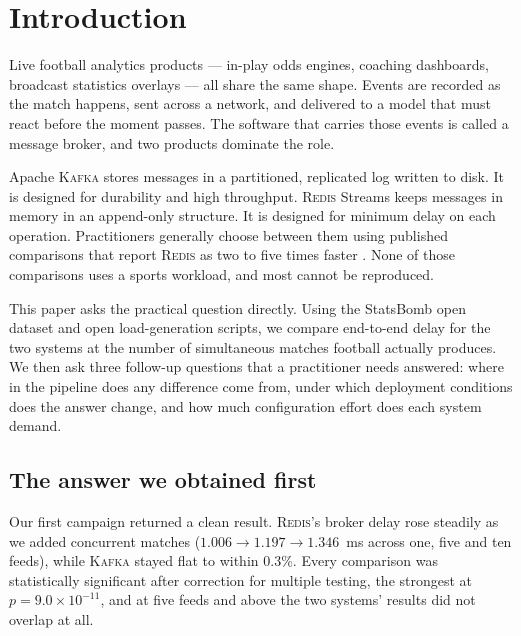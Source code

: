 \documentclass[Afour,sageh,times]{sagej}
\newcommand{\redis}{\textsc{Redis}}
\newcommand{\kafka}{\textsc{Kafka}}
\begin{document}

\maketitle

\section{Introduction}
\label{sec:intro}

Live football analytics products --- in-play odds engines, coaching dashboards, broadcast
statistics overlays --- all share the same shape. Events are recorded as the match happens, sent
across a network, and delivered to a model that must react before the moment passes. The software
that carries those events is called a message broker, and two products dominate the role.

Apache \kafka{} \cite{kreps2011kafka} stores messages in a partitioned, replicated log written to
disk. It is designed for durability and high throughput. \redis{} Streams
\cite{redis2017streams} keeps messages in memory in an append-only structure. It is designed for
minimum delay on each operation. Practitioners generally choose between them using published
comparisons that report \redis{} as two to five times faster
\cite{medium_benchmark_2025,github_benchmark_2025,jusdb2025}. None of those comparisons uses a
sports workload, and most cannot be reproduced.

This paper asks the practical question directly. Using the StatsBomb open dataset
\cite{statsbomb2023} and open load-generation scripts, we compare end-to-end delay for the two
systems at the number of simultaneous matches football actually produces. We then ask three
follow-up questions that a practitioner needs answered: where in the pipeline does any difference
come from, under which deployment conditions does the answer change, and how much configuration
effort does each system demand.

\subsection{The answer we obtained first}

Our first campaign returned a clean result. \redis{}'s broker delay rose steadily as we added
concurrent matches ($1.006 \rightarrow 1.197 \rightarrow 1.346$~ms across one, five and ten
feeds), while \kafka{} stayed flat to within $0.3\%$. Every comparison was statistically
significant after correction for multiple testing, the strongest at $p = 9.0\times10^{-11}$, and
at five feeds and above the two systems' results did not overlap at all.
\end{document}

